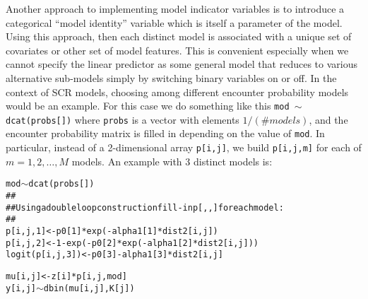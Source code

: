 Another approach to implementing model indicator variables is to
introduce a categorical ``model identity'' variable which is itself
 a parameter of the model. Using this approach, then each 
distinct model is associated with a unique set of covariates or
other set of model features. This is convenient especially when we
cannot specify the linear predictor as some general model that reduces
to various alternative sub-models simply by switching binary variables
on or off. In the context of SCR models, choosing among different
encounter probability models would be an example.  For this case we do
something like this \mbox{\tt mod  $\sim$  dcat(probs[])}
where \mbox{\tt probs} is a vector with elements $1/(\# models)$, and
the encounter probability matrix is filled in depending on the value
 of \mbox{\tt mod}.
In particular, instead of a 2-dimensional array
 \mbox{\tt p[i,j]},  we build \mbox{\tt p[i,j,m]} for each of
$m=1,2,\ldots,M$ models. An example with 3 distinct models is:
{\small
\begin{alltt}
  mod  \(\sim\) dcat(probs[])
\#\#
\#\# Using a double loop construction fill-in p[,,] for each model:
\#\#
  p[i,j,1] <-  p0[1]*exp( - alpha1[1]*dist2[i,j] )
  p[i,j,2] <-  1-exp(-p0[2]*exp( - alpha1[2]*dist2[i,j] ) )
  logit(p[i,j,3]) <- p0[3] - alpha1[3]*dist2[i,j]

  mu[i,j] <- z[i]*p[i,j,mod]
  y[i,j] \(\sim\) dbin(mu[i,j],K[j])
\end{alltt}
}


